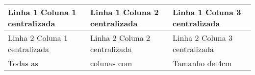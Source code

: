 \documentclass{article}
\begin{document}

	\begin{tabular}{|>{\centering\arraybackslash}m{4cm}|>{\centering\arraybackslash}m{4cm}|>{\centering\arraybackslash}m{4cm}|}
		\hline
		Linha 1 Coluna 1 centralizada & Linha 1 Coluna 2 centralizada & Linha 1 Coluna 3 centralizada \\
		\hline
		Linha 2 Coluna 1 centralizada & Linha 2 Coluna 2 centralizada & Linha 2 Coluna 3 centralizada \\
		Todas as & colunas com & Tamanho de 4cm \\
		\hline
	\end{tabular}
	
\end{document}
